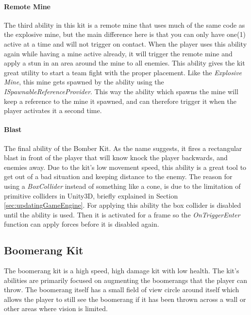 \paragraph{Remote Mine}
The third ability in this kit is a remote mine that uses much of the same code as the explosive mine, but the main difference here is that you can only have one(1) active at a time and will not trigger on contact. When the player uses this ability again while having a mine active already, it will trigger the remote mine and apply a stun in an area around the mine to all enemies. This ability gives the kit great utility to start a team fight with the proper placement. Like the \emph{Explosive Mine}, this mine gets spawned by the ability using the \emph{ISpawnableReferenceProvider}. This way the ability which spawns the mine will keep a reference to the mine it spawned, and can therefore trigger it when the player activates it a second time.

\paragraph{Blast}
The final ability of the Bomber Kit. As the name suggests, it fires a rectangular blast in front of the player that will know knock the player backwards, and enemies away. Due to the kit's low movement speed, this ability is a great tool to get out of a bad situation and keeping distance to the enemy. The reason for using a \emph{BoxCollider} instead of something like a cone, is due to the limitation of primitive colliders in Unity3D, briefly explained in Section \ref{sec:updatingGameEngine}. For applying this ability the box collider is disabled until the ability is used. Then it is activated for a frame so the \emph{OnTriggerEnter} function can apply forces before it is disabled again.

\subsection{Boomerang Kit}
The boomerang kit is a high speed, high damage kit with low health. The kit's abilities are primarily focused on augmenting the boomerangs that the player can throw. The boomerang itself has a small field of view circle around itself which allows the player to still see the boomerang if it has been thrown across a wall or other areas where vision is limited. 

